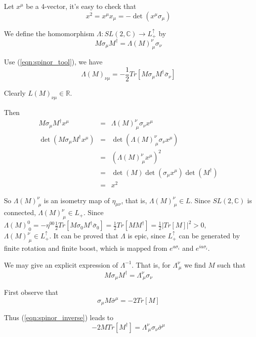 \documentclass[12pt]{book}
\begin{document}
	Let $x^\mu$ be a 4-vector, it's easy to check that
	\begin{equation}
		x^2=x^\mu x_\mu=-\det(x^\mu\sigma_\mu)
	\end{equation}
	
	We define the homomorphism $\Lambda:SL(2,\mathbb C)\rightarrow L_+^\uparrow$ by
	\begin{equation}
		M\sigma_\mu M^\dagger=\Lambda(M)_{\ \mu}^\nu\sigma_\nu
	\end{equation}
	
	Use (\ref{eqn:spinor_tool}), we have
	\begin{equation}
		\Lambda(M)_{\nu\mu}=-\frac 12Tr[M\sigma_\mu M^\dagger\bar\sigma_\nu]
	\end{equation}
	
	Clearly $L(M)_{\nu\mu}\in \mathbb R$.
	
	Then
	\begin{eqnarray}
		M\sigma_\mu M^\dagger x^\mu&=&\Lambda(M)_{\ \mu}^\nu\sigma_\nu x^\mu\\
		\det(M\sigma_\mu M^\dagger x^\mu)&=&\det(\Lambda(M)_{\ \mu}^\nu\sigma_\nu x^\mu)\\
		&=&(\Lambda(M)_{\ \mu}^\nu x^\mu)^2\\
		&=&\det(M)\det(\sigma_\mu x^\mu)\det(M^\dagger)\\
		&=&x^2
	\end{eqnarray}
	
	So $\Lambda(M)_{\ \mu}^\nu$ is an isometry map of $\eta_{\mu\nu}$, that is, $\Lambda(M)_{\ \mu}^\nu\in L$. Since $SL(2,\mathbb C)$ is connected, $\Lambda(M)_{\ \mu}^\nu\in L_+$. Since $\Lambda(M)^0_{\ 0}=-\eta^{00}\frac 12Tr[M\sigma_0 M^\dagger\bar\sigma_0]=\frac 12Tr[MM^\dagger]=\frac 12|Tr[M]|^2>0$, $\Lambda(M)_{\ \mu}^\nu\in L_+^\uparrow$. It can be proved that $\Lambda$ is epic, since $L_+^\uparrow$ can be generated by finite rotation and finite boost, which is mapped from $e^{a\sigma_i}$ and $e^{ia\sigma_i}$.
	
	We may give an explicit expression of $\Lambda^{-1}$. That is, for $\Lambda^\nu_{\ \mu}$ we find $M$ such that
	\begin{equation}
		M\sigma_\mu M^\dagger=\Lambda_{\ \mu}^\nu\sigma_\nu \label{eqn:spinor_inverse}
	\end{equation}
	
	First observe that 
	\begin{equation}
		\sigma_\mu M\bar\sigma^\mu=-2Tr[M]
	\end{equation}

	Thus (\ref{eqn:spinor_inverse}) leads to
	\begin{equation}
		-2MTr[M^\dagger]=\Lambda_{\ \mu}^\nu\sigma_\nu \bar\sigma^\mu \label{eqn:spinor_inverse2}
	\end{equation}
	
\end{document}
